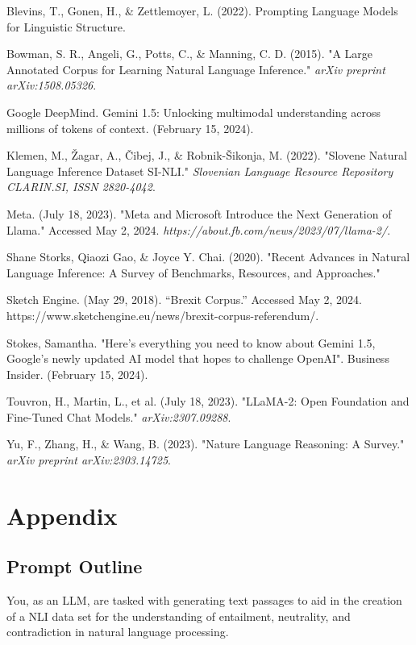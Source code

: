 \documentclass[fleqn,moreauthors,10pt]{ds_report}
\begin{document}
Blevins, T., Gonen, H., \& Zettlemoyer, L. (2022). Prompting Language Models for Linguistic Structure.

Bowman, S. R., Angeli, G., Potts, C., \& Manning, C. D. (2015). "A Large Annotated Corpus for Learning Natural Language Inference." \textit{arXiv preprint arXiv:1508.05326}.

Google DeepMind. Gemini 1.5: Unlocking multimodal understanding across millions of tokens of context. (February 15, 2024).

Klemen, M., Žagar, A., Čibej, J., \& Robnik-Šikonja, M. (2022). "Slovene Natural Language Inference Dataset SI-NLI." \textit{Slovenian Language Resource Repository CLARIN.SI, ISSN 2820-4042}.

Meta. (July 18, 2023). "Meta and Microsoft Introduce the Next Generation of Llama." Accessed May 2, 2024. \allowbreak \textit{https://about.fb.com/news/2023/07/llama-2/}.

Shane Storks, Qiaozi Gao, \& Joyce Y. Chai. (2020). "Recent Advances in Natural Language Inference: A Survey of Benchmarks, Resources, and Approaches."

Sketch Engine. (May 29, 2018). “Brexit Corpus.” Accessed May 2, 2024. https://www.sketchengine.eu/news/brexit-corpus-referendum/.

Stokes, Samantha. "Here's everything you need to know about Gemini 1.5, Google's newly updated AI model that hopes to challenge OpenAI". Business Insider.  (February 15, 2024).

Touvron, H., Martin, L., et al. (July 18, 2023). "LLaMA-2: Open Foundation and Fine-Tuned Chat Models." \textit{arXiv:2307.09288}.

Yu, F., Zhang, H., \& Wang, B. (2023). "Nature Language Reasoning: A Survey." \textit{arXiv preprint arXiv:2303.14725}.

\vspace{\baselineskip}

\section*{Appendix}

\subsection{Prompt Outline}

You, as an LLM, are tasked with generating text passages to aid in the creation of a NLI data set for the understanding of entailment, neutrality, and contradiction in natural language processing.
\end{document}
